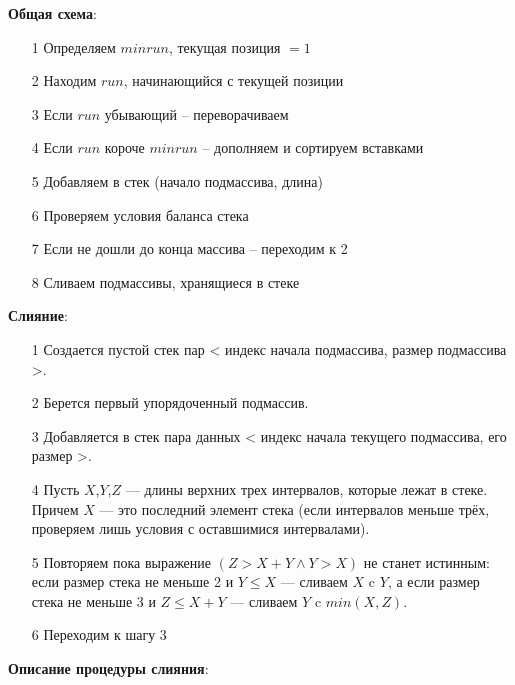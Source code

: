 \noindent\textbf{Общая схема}:\\

\begin{itemize}
    \item[1] Определяем $minrun$, текущая позиция $= 1$
    \item[2] Находим $run$, начинающийся с текущей позиции
	\item[3] Если $run$ убывающий \--- переворачиваем
	\item[4] Если $run$ короче $minrun$ \--- дополняем и сортируем вставками
	\item[5] Добавляем в стек (начало подмассива, длина)
	\item[6] Проверяем условия баланса стека 
	\item[7] Если не дошли до конца массива \--- переходим к 2
	\item[8] Сливаем подмассивы, хранящиеся в стеке
\end{itemize}

\noindent\textbf{Слияние}:\\

\begin{itemize}
    \item[1]  Создается пустой стек пар < индекс начала подмассива, размер подмассива >.
    \item[2] Берется первый упорядоченный подмассив.
	\item[3] Добавляется в стек пара данных < индекс начала текущего подмассива, его размер >.
	\item[4]  Пусть $X$,$Y$,$Z$ — длины верхних трех интервалов, которые лежат в стеке. Причем $X$ — это последний элемент стека (если интервалов меньше трёх, проверяем лишь условия с оставшимися интервалами).
	\item[5] Повторяем пока выражение $(Z>X+Y \wedge Y>X)$ не станет истинным: если размер стека не меньше 2 и $Y \leq X$ — сливаем $X$ c $Y$, а если размер стека не меньше 3 и $Z \leq X+Y$ — сливаем $Y$ c $min(X,Z)$. 
	\item[6]  Переходим к шагу 3 
\end{itemize}
	
	\noindent\textbf{Описание процедуры слияния}:\\

